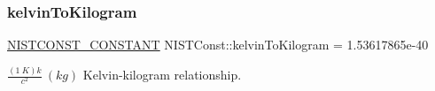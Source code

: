 \subsubsection{\texorpdfstring{kelvin\+To\+Kilogram}{kelvinToKilogram}}
{\footnotesize\ttfamily \mbox{\hyperlink{_n_i_s_t_const_8hpp_a2b0fc1d7452373f816175dd86ce26729}{N\+I\+S\+T\+C\+O\+N\+S\+T\+\_\+\+C\+O\+N\+S\+T\+A\+NT}} N\+I\+S\+T\+Const\+::kelvin\+To\+Kilogram = 1.\+53617865e-\/40}

$\frac{(1\ K)k}{c^2} \ (kg)$ Kelvin-\/kilogram relationship. 